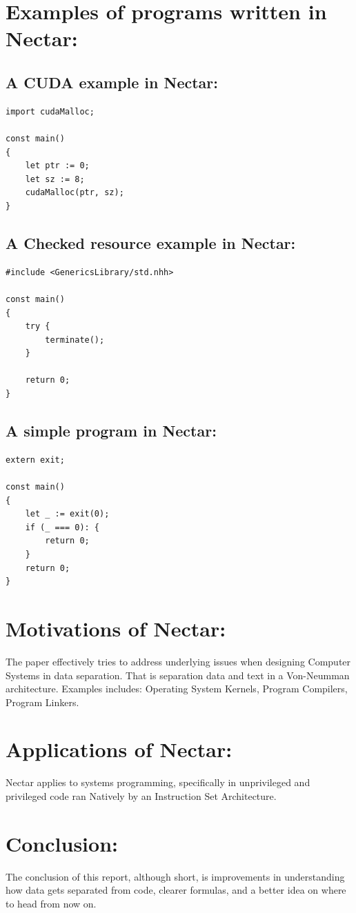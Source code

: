 \documentclass{article}
\begin{document}
\section{Examples of programs written in Nectar:}
\subsection{A CUDA example in Nectar:}
\begin{lstlisting}
import cudaMalloc;

const main()
{
    let ptr := 0;
    let sz := 8;
    cudaMalloc(ptr, sz);
}
\end{lstlisting}
\subsection{A Checked resource example in Nectar:}
\begin{lstlisting}
#include <GenericsLibrary/std.nhh>

const main()
{
	try {
		terminate();
	}
	
	return 0;
}
\end{lstlisting}
\subsection{A simple program in Nectar:}
\begin{lstlisting}
extern exit;

const main()
{
	let _ := exit(0);
	if (_ === 0): {
		return 0;
	}
	return 0;
}
\end{lstlisting}
\section{Motivations of Nectar:}
The paper effectively tries to address underlying issues when designing Computer Systems in data separation. That is separation data and text in a Von-Neumman architecture. Examples includes: Operating System Kernels, Program Compilers, Program Linkers.
\section{Applications of Nectar:}
Nectar applies to systems programming, specifically in unprivileged and privileged code ran Natively by an Instruction Set Architecture.
\section{Conclusion:}
The conclusion of this report, although short, is improvements in understanding how data gets separated from code, clearer formulas, and a better idea on where to head from now on.
\end{document}
